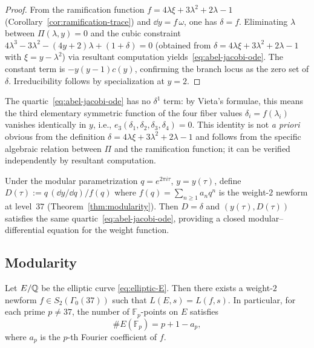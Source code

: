 \begin{proof}
From the ramification function $f=4\lambda\xi+3\lambda^2+2\lambda-1$ (Corollary~\ref{cor:ramification-trace}) and $\dd y=f\,\omega$, one has $\delta=f$.
Eliminating $\lambda$ between $\Pi(\lambda,y)=0$ and the cubic constraint $4\lambda^3-3\lambda^2-(4y+2)\lambda+(1+\delta)=0$ (obtained from $\delta=4\lambda\xi+3\lambda^2+2\lambda-1$ with $\xi=y-\lambda^2$) via resultant computation yields~\eqref{eq:abel-jacobi-ode}.
The constant term is $-y(y-1)c(y)$, confirming the branch locus as the zero set of $\delta$.
Irreducibility follows by specialization at $y=2$.
\end{proof}

\begin{remark}\label{rmk:vanishing-delta1}
The quartic~\eqref{eq:abel-jacobi-ode} has no $\delta^1$ term: by Vieta's formulae, this means the third elementary symmetric function of the four fiber values $\delta_i=f(\lambda_i)$ vanishes identically in $y$, i.e., $e_3(\delta_1,\delta_2,\delta_3,\delta_4)=0$.
This identity is not \emph{a priori} obvious from the definition $\delta=4\lambda\xi+3\lambda^2+2\lambda-1$ and follows from the specific algebraic relation between $\Pi$ and the ramification function; it can be verified independently by resultant computation.
\end{remark}

\begin{remark}\label{rmk:modular-ode}
Under the modular parametrization $q=e^{2\pi i\tau}$, $y=y(\tau)$, define $D(\tau):=q\,(\dd y/\dd q)/f(q)$ where $f(q)=\sum_{n\ge 1}a_n q^n$ is the weight-$2$ newform at level~$37$ (Theorem~\ref{thm:modularity}).
Then $D=\delta$ and $(y(\tau),D(\tau))$ satisfies the same quartic~\eqref{eq:abel-jacobi-ode}, providing a closed modular--differential equation for the weight function.
\end{remark}

\subsection{Modularity}

\begin{theorem}\label{thm:modularity}
Let $E/\mathbb{Q}$ be the elliptic curve \eqref{eq:elliptic-E}.
Then there exists a weight-$2$ newform $f\in S_2(\Gamma_0(37))$ such that $L(E,s)=L(f,s)$.
In particular, for each prime $p\neq 37$, the number of $\mathbb{F}_p$-points on $E$ satisfies
\begin{equation}\label{eq:frobenius-trace}
\#E(\mathbb{F}_p)=p+1-a_p,
\end{equation}
where $a_p$ is the $p$-th Fourier coefficient of $f$.
\end{theorem}

